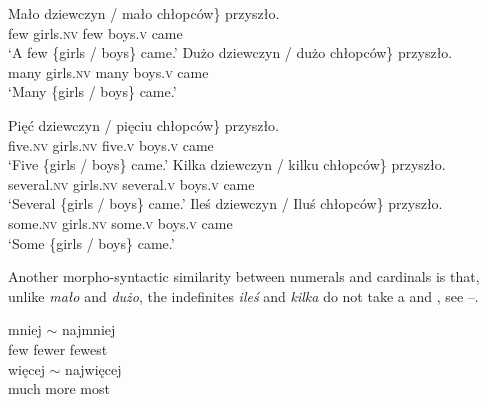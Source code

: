 \documentclass[output=paper, newtxmath, colorlinks, citecolor=brown]{langsci/langscibook}
\begin{document}
	\ea \label{ex:gender-agreement-quantifiers} \ea \gll \minsp{\{} Mało dziewczyn / mało chłopców\} przyszło.\\
	{} few girls.\textsc{nv} {} few boys.\textsc{v} came\\
	\glt `A few \{girls / boys\} came.'
	\ex \gll \minsp{\{} Dużo dziewczyn / dużo chłopców\} przyszło.\\
	{} many girls.\textsc{nv} {} many boys.\textsc{v} came\\
	\glt `Many \{girls / boys\} came.'
    \z
    \z

	\ea \label{ex:gender-agreement-cardinals} \ea \gll \minsp{\{} Pięć dziewczyn / pięciu chłopców\} przyszło.\\
	{} five.\textsc{nv} girls.\textsc{nv} {} five.\textsc{v} boys.\textsc{v} came\\
	\glt `Five \{girls / boys\} came.'
	\ex \gll \minsp{\{} Kilka dziewczyn / kilku chłopców\} przyszło.\\
	{} several.\textsc{nv} girls.\textsc{nv} {} several.\textsc{v} boys.\textsc{v} came\\
	\glt `Several \{girls / boys\} came.'
	\ex \gll \minsp{\{} Ileś dziewczyn / Iluś chłopców\} przyszło.\\
	{} some.\textsc{nv} girls.\textsc{nv} {} some.\textsc{v} boys.\textsc{v} came\\
	\glt `Some \{girls / boys\} came.'
	\z
    \z

	\noindent Another morpho-syntactic similarity between  numerals and cardinals is that, unlike \textit{mało} and \textit{dużo}, the indefinites \textit{ileś} and \textit{kilka} do not take a  and , see --.

	\ea \label{ex:comparison-quantifiers} \ea {} {mniej $\sim$} najmniej\\
	few fewer fewest\\
	\ex {} {więcej $\sim$} najwięcej\\
	much more most\\
	\z
    \z
\end{document}
